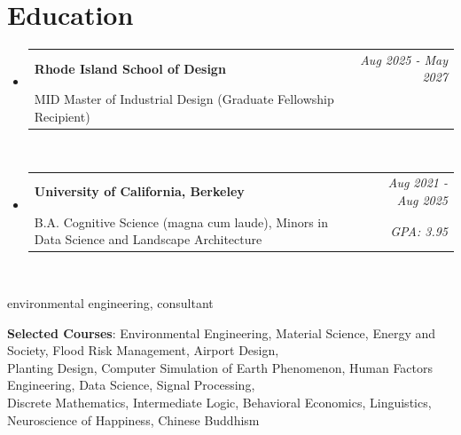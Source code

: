 \documentclass[letterpaper,10pt]{article}
\makeatletter
\newcommand{\subheadingtitlevspace}{
\vspace{-3pt}
}
\newcommand{\resumeSubheading}[4]{
  \item
    \begin{tabular*}{0.97\textwidth}[t]{l@{\extracolsep{\fill}}r}
      \textbf{#1} & \textit{#2} \\
      #3 & \textit{#4} \\
    \end{tabular*}\vspace{-10pt}
}
\newcommand{\resumeSubHeadingListStart}{\subheadingtitlevspace\begin{itemize}[leftmargin=0.15in, label={}]}
\newcommand{\resumeSubHeadingListEnd}{\end{itemize}}
\newcommand{\courseList}[1]{
    \begin{itemize}[leftmargin=0.15in, label={}]
    {\item{
     {\textbf{Selected Courses}: #1}\\
    }}
    \end{itemize}
}
\makeatother
\begin{document}
\vspace{-7pt}
\section{Education}
    \resumeSubHeadingListStart
    \resumeSubheading
      {Rhode Island School of Design}{Aug 2025 - May 2027}{MID Master of Industrial Design (Graduate Fellowship Recipient)}{}\\
  \resumeSubHeadingListEnd
\vspace{6pt}
    \resumeSubHeadingListStart
    \resumeSubheading
      {University of California, Berkeley}{Aug 2021 - Aug 2025}{B.A. Cognitive Science (magna cum laude), Minors in Data Science and Landscape Architecture}{GPA: 3.95}\\
  \resumeSubHeadingListEnd
\vspace{6pt}
\begin{taggedblock}{environmental engineering, consultant}{
    \courseList{Environmental Engineering, Material Science, Energy and Society, Flood Risk Management, Airport Design, \\
     Planting Design, Computer Simulation of Earth Phenomenon, Human Factors Engineering, Data Science, Signal Processing, \\
     Discrete Mathematics, Intermediate Logic, Behavioral Economics, Linguistics, Neuroscience of Happiness, Chinese Buddhism}
    }
\end{taggedblock}
\end{document}
